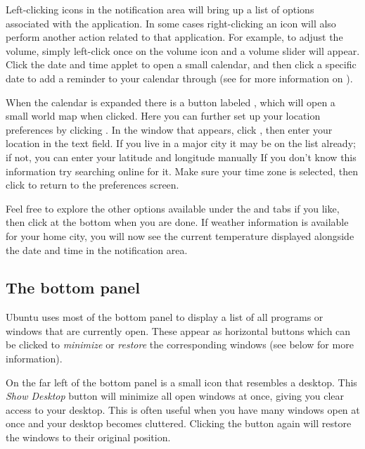 %
Left-clicking icons in the notification area will bring up a list of options associated with the application. In some cases right-clicking an icon will also perform another action related to that application. For example, to adjust the volume, simply left-click once on the volume icon and a volume slider will appear. Click the date and time applet to open a small calendar, and then click a specific date to add a reminder to your calendar through  (see  for more information on ).

When the calendar is expanded there is a button labeled , which will open a small world map when clicked. Here you can further set up your location preferences by clicking . In the window that appears, click , then enter your location in the text field. If you live in a major city it may be on the list already; if not, you can enter your latitude and longitude manually If you don't know this information try searching online for it. Make sure your time zone is selected, then click  to return to the preferences screen. 

Feel free to explore the other options available under the  and  tabs if you like, then click  at the bottom when you are done. If weather information is available for your home city, you will now see the current temperature displayed alongside the date and time in the notification area.

\subsection{The bottom panel}

Ubuntu uses most of the bottom panel to display a list of all programs or windows that are currently open. These appear as horizontal buttons which can be clicked to \emph{minimize} or \emph{restore} the corresponding windows (see  below for more information).


On the far left of the bottom panel is a small icon that resembles a desktop. This \emph{Show Desktop} button will \gls{minimize} all open windows at once, giving you clear access to your desktop. This is often useful when you have many windows open at once and your desktop becomes cluttered. Clicking the button again will restore the windows to their original position.

